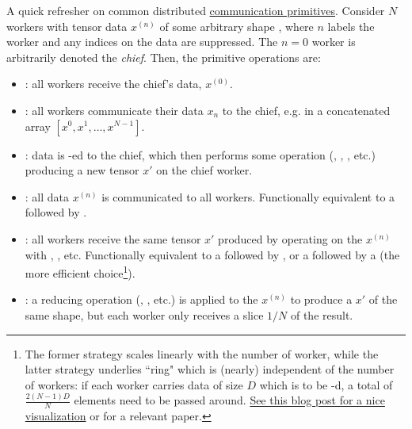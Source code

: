 \documentclass[11pt]{article}
\begin{document}
A quick refresher on common distributed
\href{https://docs.nvidia.com/deeplearning/nccl/user-guide/docs/usage/collectives.html}{communication
	primitives}.  Consider $ N $ workers with tensor data $ x ^{ (n) }  $ of some arbitrary shape
, where $ n $ labels the worker and any indices on the data are suppressed. The $
	n=0 $ worker is arbitrarily denoted the \textit{chief}.  Then, the primitive operations are:
\begin{itemize}
	\item {}: all workers receive  the chief's data, $ x ^{ (0) }  $.
	\item {}: all workers communicate their data $ x _{ n } $ to the chief, e.g. in a
	      concatenated array $ [x ^{ 0 }, x ^{ 1 }, \ldots , x ^{ N-1 }] $.
	\item {}: data is -ed to the chief, which then performs some
	      operation (, , , etc.) producing a new tensor $
		      x' $ on the chief worker.
	\item {}: all data $ x ^{ (n) } $ is communicated to all workers. Functionally
	      equivalent to a  followed by .
	\item {}: all workers receive the same tensor $ x' $ produced by operating on
	      the $ x ^{ (n) } $ with , , etc. Functionally equivalent to a
	       followed by , or a  followed
	      by a  (the more efficient choice\footnote{The former strategy scales
		      linearly with the number of worker, while the latter strategy underlies ``ring"
		       which is (nearly) independent of the number of workers: if each
		      worker carries data of size $ D $ which is to be -d, a total of $
			      \frac{ 2 \left ( N-1 \right )D }{ N } $ elements need to be passed around.
		      \href{https://andrew.gibiansky.com/blog/machine-learning/baidu-allreduce/}{See this blog
			      post for a nice visualization} or \cite{bandwidthOptimalAllReduce2009} for a relevant
		      paper.\label{foot_all_reduce}}).
	\item {}: a reducing operation (, , etc.) is
	      applied to the $ x ^{ (n) } $ to produce a $ x' $ of the same shape, but each worker only
	      receives a slice $ 1/N $ of the result.
\end{itemize}
\end{document}
